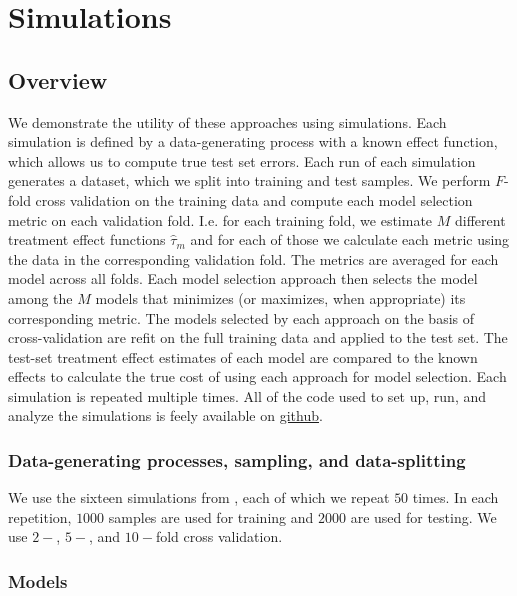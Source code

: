 \section{Simulations}
\label{simulations}

\subsection{Overview}

We demonstrate the utility of these approaches using simulations. Each simulation is defined by a data-generating process with a known effect function, which allows us to compute true test set errors. Each run of each simulation generates a dataset, which we split into training and test samples. We perform $F$-fold cross validation on the training data and compute each model selection metric on each validation fold. I.e. for each training fold, we estimate $M$ different treatment effect functions $\hat\tau_m$ and for each of those we calculate each metric using the data in the corresponding validation fold. The metrics are averaged for each model across all folds. Each model selection approach then selects the model among the $M$ models that minimizes (or maximizes, when appropriate) its corresponding metric. The models selected by each approach on the basis of cross-validation are refit on the full training data and applied to the test set. The test-set treatment effect estimates of each model are compared to the known effects to calculate the true cost of using each approach for model selection. Each simulation is repeated multiple times. All of the code used to set up, run, and analyze the simulations is feely available on \href{https://github.com/som-shahlab/ITE-model-selection}{github}.

\subsubsection{Data-generating processes, sampling, and data-splitting}

We use the sixteen simulations from \citet{Powers:2017wd}, each of which we repeat $50$ times. In each repetition, $1000$ samples are used for training and $2000$ are used for testing. We use $2-$, $5-$, and $10-$fold cross validation.

\subsubsection{Models}

